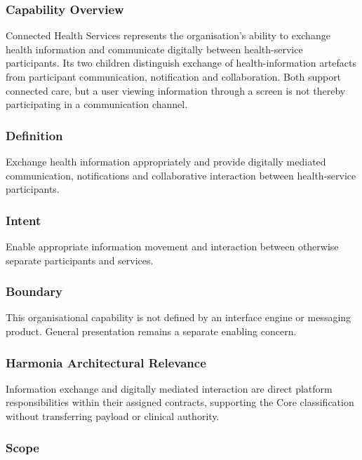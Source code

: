 \subsubsection*{Capability Overview}

Connected Health Services represents the organisation's ability to exchange health information and communicate digitally between health-service participants. Its two children distinguish exchange of health-information artefacts from participant communication, notification and collaboration. Both support connected care, but a user viewing information through a screen is not thereby participating in a communication channel.

\subsubsection*{Definition}

Exchange health information appropriately and provide digitally mediated communication, notifications and collaborative interaction between health-service participants.

\subsubsection*{Intent}

Enable appropriate information movement and interaction between otherwise separate participants and services.

\subsubsection*{Boundary}

This organisational capability is not defined by an interface engine or messaging product. General presentation remains a separate enabling concern.

\subsubsection*{Harmonia Architectural Relevance}

Information exchange and digitally mediated interaction are direct platform responsibilities within their assigned contracts, supporting the Core classification without transferring payload or clinical authority.

\subsubsection*{Scope}
